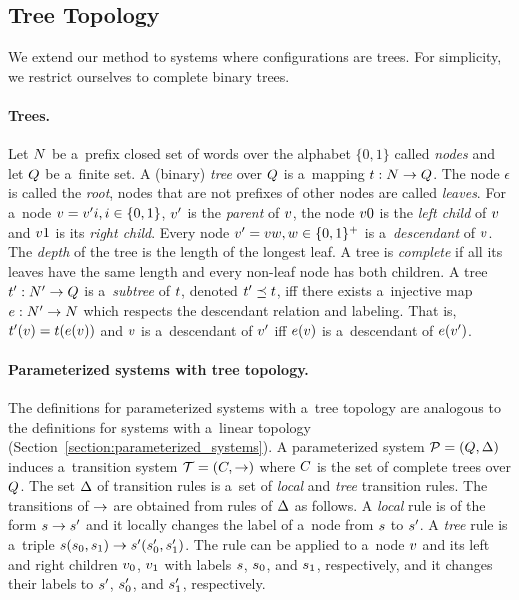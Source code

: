 \subsection{Tree Topology}
\label{section:trees}
We extend our method to systems where configurations are trees.  For
simplicity, we restrict ourselves to complete binary trees.
%
\paragraph{Trees.}
Let $N$ be a~prefix closed set of words over the alphabet
$\{0,1\}$ called \emph{nodes} and let $Q$ be a~finite set.
%
A (binary) \emph{tree} over $Q$ is a~mapping
$t:N\rightarrow Q$.
%
The node $\epsilon$ is called the \emph{root}, nodes that are not
prefixes of other nodes are called \emph{leaves}.
%
For a~node $v = v'i,i\in\{0,1\}$, $v'$ is the
\emph{parent} of $v$, the node $v 0$ is the \emph{left child}
of $v$ and $v 1$ is its \emph{right child}.
%
Every node $v' =v w,w\in\{0,1\}^+$ is a~\emph{descendant} of $v$. 
The \emph{depth} of the tree is the length of the longest leaf.  A
tree is \emph{complete} if all its leaves have the same length and
every non-leaf node has both children.
%
A tree $t':N'\rightarrow Q$ is a~\emph{subtree} of
$t$, denoted $t'\preceq t$, iff there exists a~injective
map $e:N'\rightarrow N$ which respects the descendant
relation and labeling. That is, $t'(v) =
t(e(v))$ and $v$ is a~descendant of $v'$ iff
$e(v)$ is a~descendant of $e(v')$.
%

\paragraph{Parameterized systems with tree topology.}
The definitions for parameterized systems with a~tree topology are
 analogous to the definitions for systems with a~linear topology 
(Section~\ref{section:parameterized_systems}).
%
A parameterized system ${\mathcal P} = (Q,\Delta)$ induces a~transition
system ${\mathcal T} = (C,\rightarrow)$ where $C$ is the set of
complete trees over $Q$.  The set $\Delta$ of transition rules is
a~set of {\it local} and \emph{tree} transition rules.  The
transitions of $\rightarrow$ are obtained from rules of $\Delta$ as
follows.  A {\it local} rule is of the form $s\rightarrow s'$ and it
locally changes the label of a~node from $s$ to $s'$.  A {\it
  tree} rule is a~triple
$s(s_0,s_1)\rightarrow s'(s_0',s_1')$. The rule can be
applied to a~node $v$ and its left and right children $v_0$,
$v_1$ with labels $s$, $s_0$, and $s_1$, respectively,
and it changes their labels to $s'$, $s_0'$, and $s_1'$,
respectively.

